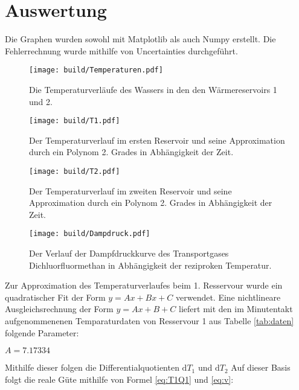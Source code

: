 \section{Auswertung}
\label{sec:Auswertung}
Die Graphen wurden sowohl mit Matplotlib als auch Numpy erstellt. Die
 Fehlerrechnung wurde mithilfe von Uncertainties durchgeführt.
 \begin{figure}
 	\centering
 	\caption{Die Temperaturverläufe des Wassers in den den Wärmereservoirs 1 und 2.}
 	\texttt{[image: build/Temperaturen.pdf]}
 	\label{fig:Graph1}
 \end{figure}
 \begin{figure}
 	\centering
 	\caption{Der Temperaturverlauf im ersten Reservoir und seine Approximation durch ein Polynom 2. Grades in Abhängigkeit der Zeit.}
 	\texttt{[image: build/T1.pdf]}
 	\label{fig:Graph1}
 \end{figure}
 \begin{figure}
 	\centering
 	\caption{Der Temperaturverlauf im zweiten Reservoir und seine Approximation durch ein Polynom 2. Grades in Abhängigkeit der Zeit.}
 	\texttt{[image: build/T2.pdf]}
 	\label{fig:Graph1}
 \end{figure}
 \begin{figure}
 	\centering
 	\caption{Der Verlauf der Dampfdruckkurve des Transportgases Dichluorfluormethan in Abhängigkeit der reziproken Temperatur.}
 	\texttt{[image: build/Dampdruck.pdf]}
 	\label{fig:Graph1}
 \end{figure}




 Zur Approximation des Temperaturverlaufes beim 1. Resservour wurde ein
 quadratischer Fit der Form $y = Ax+Bx+C$ verwendet. Eine nichtlineare
 Ausgleichsrechnung der Form $y = Ax+B+C$ liefert mit den im Minutentakt
 aufgenommenenen Temparaturdaten von Resservour 1 aus Tabelle \ref{tab:daten} folgende Parameter:
 \begin{table}
   \centering
   \label{tab:daten}
 \end{table}

 \begin{table}
   \centering
   \label{tab:daten}
 \end{table}
$A = 7.17334$

Mithilfe dieser folgen die Differentialquotienten $\text{d}T_1$ und $\text{d}T_2$
Auf dieser Basis folgt die reale Güte mithilfe von Formel \ref{eq:T1Q1} und \ref{eq:v}:

\begin{table}
  \centering
  \label{tab:datv}
\end{table}
\begin{table}
  \centering
  \label{tab:datm}
\end{table}

\begin{table}
  \centering
  \label{tab:datn}
\end{table}
